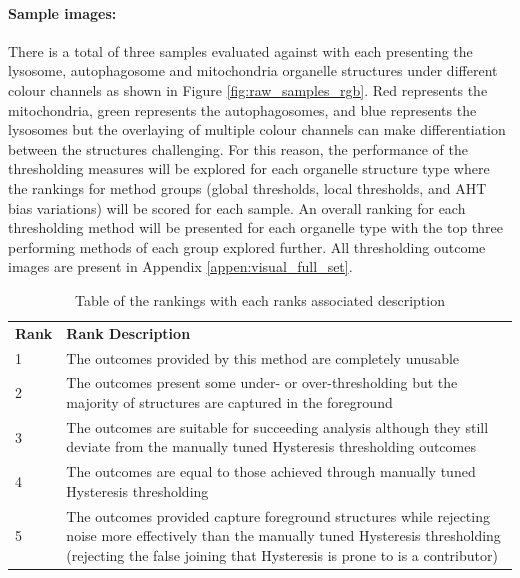 \paragraph{Sample images:} There is a total of three samples evaluated against with each presenting the lysosome, autophagosome and mitochondria organelle structures under different colour channels as shown in Figure \ref{fig:raw_samples_rgb}. Red represents the mitochondria, green represents the autophagosomes, and blue represents the lysosomes but the overlaying of multiple colour channels can make differentiation between the structures challenging. For this reason, the performance of the thresholding measures will be explored for each organelle structure type where the rankings for method groups (global thresholds, local thresholds, and AHT bias variations) will be scored for each sample. An overall ranking for each thresholding method will be presented for each organelle type with the top three performing methods of each group explored further. All thresholding outcome images are present in Appendix \ref{appen:visual_full_set}. 
\begin{table}
	\centering
	\begin{tabularx}{\linewidth}{|l|X|}
		\textbf{Rank}& \textbf{Rank Description}\\
		1 & The outcomes provided by this method are completely unusable \\
		2 & The outcomes present some under- or over-thresholding but the majority of structures are captured in the foreground \\
		3 & The outcomes are suitable for succeeding analysis although they still deviate from the manually tuned Hysteresis thresholding outcomes \\
		4 & The outcomes are equal to those achieved through manually tuned Hysteresis thresholding\\
		5 & The outcomes provided capture foreground structures while rejecting noise more effectively than the manually tuned Hysteresis thresholding (rejecting the false joining that Hysteresis is prone to is a contributor) \\
	\end{tabularx}
	\caption{Table of the rankings with each ranks associated description}
	\label{tab:rank_table}
\end{table}



